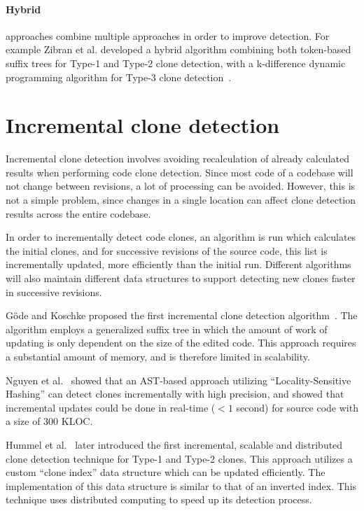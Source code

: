 \paragraph{Hybrid} approaches combine multiple approaches in order to improve detection.
For example Zibran et al. developed a hybrid algorithm combining both token-based suffix
trees for Type-1 and Type-2 clone detection, with a k-difference dynamic programming
algorithm for Type-3 clone detection~\cite{Zibran_real_time_search}.


\section{Incremental clone detection}

Incremental clone detection involves avoiding recalculation of already calculated results
when performing code clone detection. Since most code of a codebase will not change
between revisions, a lot of processing can be avoided. However, this is not a simple
problem, since changes in a single location can affect clone detection results across the
entire codebase.

In order to incrementally detect code clones, an algorithm is run which calculates the
initial clones, and for successive revisions of the source code, this list is
incrementally updated, more efficiently than the initial run. Different algorithms will
also maintain different data structures to support detecting new clones faster in
successive revisions.

Göde and Koschke proposed the first incremental clone detection
algorithm~\cite{GodeIncrementalCloneDetection}. The algorithm employs a generalized suffix
tree in which the amount of work of updating is only dependent on the size of the edited
code. This approach requires a substantial amount of memory, and is therefore limited in
scalability.

Nguyen et al.~\cite{LocalitySensitiveHashingIncremental} showed that an AST-based approach
utilizing ``Locality-Sensitive Hashing'' can detect clones incrementally with high
precision, and showed that incremental updates could be done in real-time ($< 1$ second)
for source code with a size of 300 KLOC.

Hummel et al.~\cite{IndexBasedIncrementalCloneDetection} later introduced the first incremental,
scalable and distributed clone detection technique for Type-1 and Type-2 clones. This
approach utilizes a custom ``clone index'' data structure which can be updated
efficiently. The implementation of this data structure is similar to that of an inverted
index. This technique uses distributed computing to speed up its detection process.

